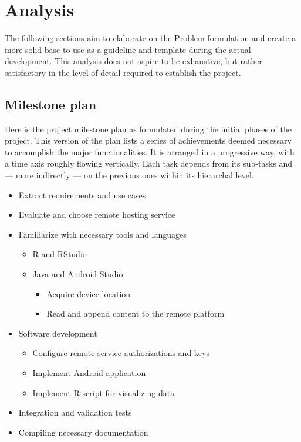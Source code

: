 \chapter{Analysis}
The following sections aim to elaborate on the Problem formulation and create a more solid base to use as a guideline and template during the actual development.
This analysis does not aspire to be exhaustive, but rather satisfactory in the level of detail required to establish the project.


\section{Milestone plan}
Here is the project milestone plan as formulated during the initial phases of the project.
This version of the plan lists a series of achievements deemed necessary to accomplish the major functionalities.
It is arranged in a progressive way, with a time axis roughly flowing vertically.
Each task depends from its sub-tasks and --- more indirectly --- on the previous ones within its hierarchal level.


\renewcommand{\labelitemi}{\textbullet}
\renewcommand{\labelitemii}{\textbullet}
\renewcommand{\labelitemiii}{\textbullet}
\renewcommand{\labelitemiv}{\textbullet}
\begin{itemize}
	\item Extract requirements and use cases
	\item Evaluate and choose remote hosting service
	\item Familiarize with necessary tools and languages
	\begin{itemize}
		\item R and RStudio
		\item Java and Android Studio
		\begin{itemize}
			\item Acquire device location
			\item Read and append content to the remote platform
		\end{itemize}
	\end{itemize}
	\item Software development
	\begin{itemize}
		\item Configure remote service authorizations and keys
		\item Implement Android application
		\item Implement R script for visualizing data
	\end{itemize}
	\item Integration and validation tests
	\item Compiling necessary documentation
\end{itemize}


